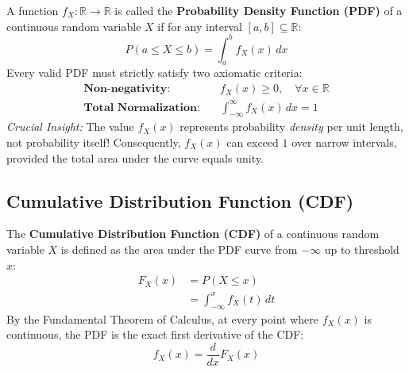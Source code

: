 \documentclass[12pt,a4paper]{article}
\begin{document}
\begin{tcolorbox}[defbox, title={\textbf{Definition: Probability Density Function (PDF)}}]
A function $f_X: \mathbb{R} \to \mathbb{R}$ is called the \textbf{Probability Density Function (PDF)} of a continuous random variable $X$ if for any interval $[a, b] \subseteq \mathbb{R}$:
\begin{equation}
  P(a \le X \le b) = \int_a^b f_X(x) \, dx
\end{equation}
Every valid PDF must strictly satisfy two axiomatic criteria:
\begin{align}
  \textbf{Non-negativity:} \quad & f_X(x) \ge 0, \quad \forall x \in \mathbb{R} \\[4pt]
  \textbf{Total Normalization:} \quad & \int_{-\infty}^\infty f_X(x) \, dx = 1
\end{align}
\textit{Crucial Insight:} The value $f_X(x)$ represents probability \textit{density} per unit length, not probability itself! Consequently, $f_X(x)$ can exceed $1$ over narrow intervals, provided the total area under the curve equals unity.
\end{tcolorbox}

\subsection{Cumulative Distribution Function (CDF)}
The \textbf{Cumulative Distribution Function (CDF)} of a continuous random variable $X$ is defined as the area under the PDF curve from $-\infty$ up to threshold $x$:
\begin{equation}
  \begin{aligned}
    F_X(x) &= P(X \le x) \\[3pt]
    &= \int_{-\infty}^x f_X(t) \, dt
  \end{aligned}
\end{equation}
By the Fundamental Theorem of Calculus, at every point where $f_X(x)$ is continuous, the PDF is the exact first derivative of the CDF:
\begin{equation}
  f_X(x) = \frac{d}{dx} F_X(x)
\end{equation}
\end{document}
